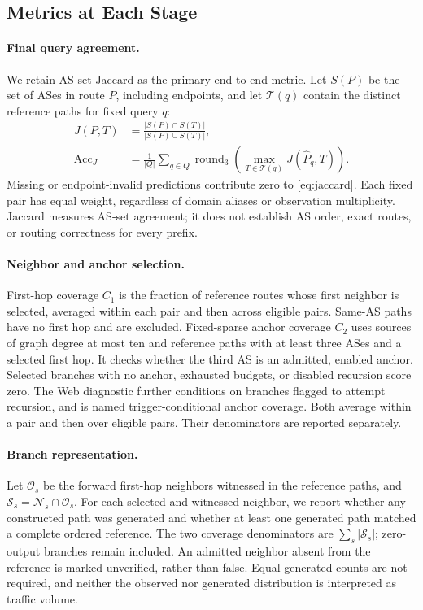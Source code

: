 \documentclass[sigconf,anonymous,review]{acmart}
\begin{document}
\subsection{Metrics at Each Stage}
\label{sec:metrics}

\paragraph{Final query agreement.}
We retain AS-set Jaccard as the primary end-to-end metric. Let $S(P)$ be the
set of ASes in route $P$, including endpoints, and let $\mathcal T(q)$ contain
the distinct reference paths for fixed query $q$:
\begin{equation}
\begin{split}
J(P,T)&=\frac{|S(P)\cap S(T)|}{|S(P)\cup S(T)|},\\
\mathrm{Acc}_J&=\frac{1}{|Q|}\sum_{q\in Q}
\operatorname{round}_3
\left(\max_{T\in\mathcal T(q)}J(\widehat P_q,T)\right).
\end{split}
\label{eq:jaccard}
\end{equation}
Missing or endpoint-invalid predictions contribute zero to
\eqref{eq:jaccard}. Each fixed pair has equal weight, regardless of domain
aliases or observation multiplicity. Jaccard measures AS-set agreement;
it does not establish AS order, exact routes, or routing correctness for
every prefix.

\paragraph{Neighbor and anchor selection.}
First-hop coverage $C_1$ is the fraction of reference routes whose first
neighbor is selected, averaged within each pair and then across eligible
pairs. Same-AS paths have no first hop and are excluded.
Fixed-sparse anchor coverage $C_2$ uses sources of graph degree at most ten
and reference paths with at least three ASes and a selected first hop. It
checks whether the third AS is an admitted, enabled anchor. Selected branches
with no anchor, exhausted budgets, or disabled recursion score zero. The Web
diagnostic further conditions on branches flagged to attempt recursion, and
is named trigger-conditional anchor coverage. Both average within a pair and
then over eligible pairs. Their denominators are reported separately.

\paragraph{Branch representation.}
Let $\mathcal O_s$ be the forward first-hop neighbors witnessed in the
reference paths, and $\mathcal S_s=\mathcal N_s\cap\mathcal O_s$.
For each selected-and-witnessed neighbor, we report whether
any constructed path was generated and whether at least one generated path
matched a complete ordered reference. The two coverage denominators are
$\sum_s|\mathcal S_s|$; zero-output branches remain included.
An admitted neighbor absent from the reference is marked unverified,
rather than false. Equal generated counts are not required, and neither
the observed nor generated distribution is interpreted as traffic volume.
\end{document}
